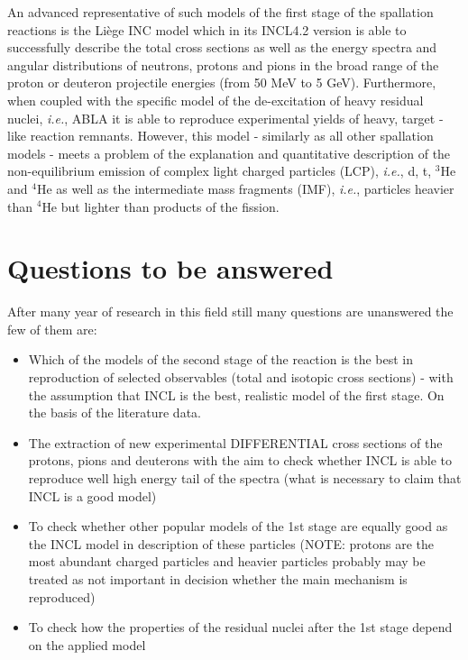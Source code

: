 	
	 An advanced representative of such models of the first stage of the spallation reactions is the Li\`ege INC model which in its INCL4.2 version \cite{boudard2002intranuclear} is able to successfully describe the total cross sections as well as the energy spectra and angular distributions of neutrons, protons and pions in the broad range of the proton or deuteron projectile energies (from 50 MeV to 5 GeV). Furthermore, when coupled with the specific model of the de-excitation of heavy residual nuclei, \emph{i.e.}, ABLA \cite{kelic2009abla07} it is able to reproduce experimental yields of heavy, target - like reaction remnants. However, this model - similarly as all other spallation models - meets a problem of the explanation and quantitative description of the non-equilibrium emission of complex light charged particles (LCP), \emph{i.e.},  d, t, $^3$He and $^4$He as well as the intermediate mass fragments (IMF), \emph{i.e.}, particles heavier than $^{4}$He but lighter than products of the fission.
\section{Questions to be answered}
After many year of research in this field still many questions are unanswered the few of them are:
\begin{itemize}
	\item Which of the models of the second stage of the reaction is the best in reproduction of selected observables (total and isotopic cross sections) -
	with the assumption that INCL is the best, realistic model of the first stage. On the basis of the literature data.
	\item The extraction of new experimental DIFFERENTIAL cross sections of the 
	protons, pions and deuterons with the aim to check whether INCL is able to reproduce well high energy tail of the spectra (what is necessary to claim that INCL is a good model)
	\item  To check whether other popular models of the 1st stage are equally good as the INCL model in description of these particles (NOTE: protons are the most abundant charged particles and heavier particles probably may be treated as not important in decision whether the main mechanism is reproduced)
	\item To check how the properties of the residual nuclei after the 1st stage depend on the applied model 
\end{itemize}

